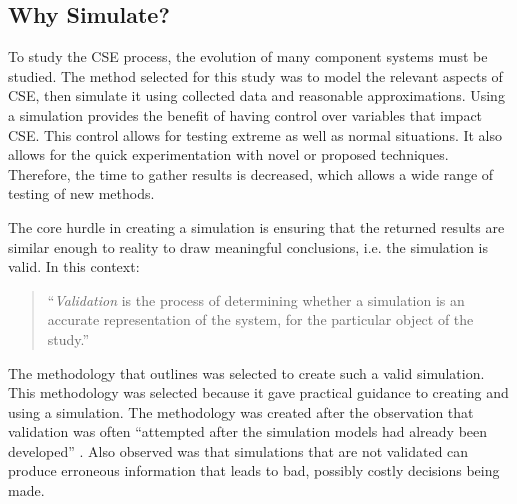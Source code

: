 \subsection{Why Simulate?}
To study the CSE process, the evolution of many component systems must be studied.
The method selected for this study was to model the relevant aspects of CSE, then simulate it using collected data and reasonable approximations.
Using a simulation provides the benefit of having control over variables that impact CSE.
This control allows for testing extreme as well as normal situations.
It also allows for the quick experimentation with novel or proposed techniques.
Therefore, the time to gather results is decreased, which allows a wide range of testing of new methods.

The core hurdle in creating a simulation is ensuring that the returned results are similar enough to reality to draw meaningful conclusions, i.e. the simulation is valid.
In this context:
\begin{quotation}
``\textit{Validation} is the process of determining whether a simulation is an accurate representation of the system, for the particular object of the study.'' \citep{Law2005}
\end{quotation}

The methodology that \cite{Law2005} outlines was selected to create such a valid simulation.
This methodology was selected because it gave practical guidance to creating and using a simulation.
The methodology was created after the observation that validation was often ``attempted after the simulation models had already been developed'' \citep{Law2005}.
Also observed was that simulations that are not validated can produce erroneous information that leads to bad, possibly costly decisions being made.

